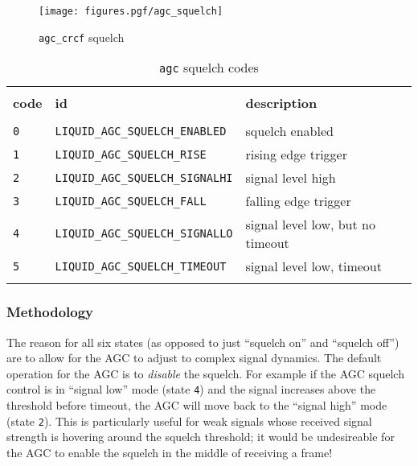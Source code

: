 \begin{figure}
\centering
  \texttt{[image: figures.pgf/agc\_squelch]}
\caption{{\tt agc\_crcf} squelch}
\label{fig:module:agc:squelch}
\end{figure}


\begin{table}[!ht]
\caption{{\tt agc} squelch codes}
\label{tab:module:agc:squelch_codes}
\centering
\begin{tabular*}{0.95\textwidth}{@{\extracolsep{\fill}}lll}

\hline\hline \\[-6pt]
{\bf code} & {\bf id} & {\bf description} \\[6pt]
\hline \\[-6pt]
{\tt 0} & {\tt LIQUID\_AGC\_SQUELCH\_ENABLED}    & squelch enabled \\
{\tt 1} & {\tt LIQUID\_AGC\_SQUELCH\_RISE}       & rising edge trigger \\
{\tt 2} & {\tt LIQUID\_AGC\_SQUELCH\_SIGNALHI}   & signal level high \\
{\tt 3} & {\tt LIQUID\_AGC\_SQUELCH\_FALL}       & falling edge trigger \\
{\tt 4} & {\tt LIQUID\_AGC\_SQUELCH\_SIGNALLO}   & signal level low, but no timeout \\
{\tt 5} & {\tt LIQUID\_AGC\_SQUELCH\_TIMEOUT}    & signal level low, timeout \\ \\[-6pt]

\hline\hline
\end{tabular*}
\end{table}%


\subsubsection{Methodology}
\label{module:agc:squelch:methodology}
The reason for all six states (as opposed to just ``squelch on'' and ``squelch
off'') are to allow for the AGC to adjust to complex signal dynamics.
The default operation for the AGC is to {\it disable} the squelch.
For example if the AGC squelch control is in ``signal low'' mode
(state {\tt 4}) and the signal increases above the threshold before timeout,
the AGC will move back to the ``signal high'' mode (state {\tt 2}).
This is particularly useful for weak signals whose received signal strength is
hovering around the squelch threshold; it would be undesireable for the AGC to
enable the squelch in the middle of receiving a frame!

